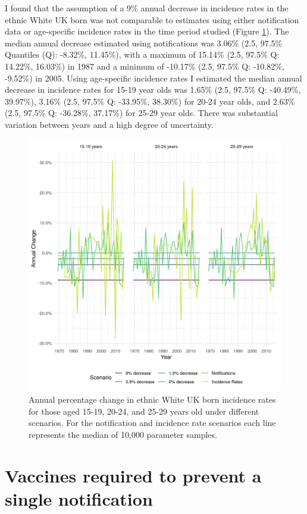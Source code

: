 \documentclass[11pt,twoside]{bristolthesis}
\begin{document}
  I found that the assumption of a 9\% annual decrease in incidence rates in the ethnic White UK born was not comparable to estimates using either notification data or age-specific incidence rates in the time period studied (Figure \ref{fig:plot-annual-change}). The median annual decrease estimated using notifications was 3.06\% (2.5, 97.5\% Quantiles (Q): -8.32\%, 11.45\%), with a maximum of 15.14\% (2.5, 97.5\% Q: 14.22\%, 16.03\%) in 1987 and a minimum of -10.17\% (2.5, 97.5\% Q: -10.82\%, -9.52\%) in 2005. Using age-specific incidence rates I estimated the median annual decrease in incidence rates for 15-19 year olds was 1.65\% (2.5, 97.5\% Q: -40.49\%, 39.97\%), 3.16\% (2.5, 97.5\% Q: -33.95\%, 38.30\%) for 20-24 year olds, and 2.63\% (2.5, 97.5\% Q: -36.28\%, 37.17\%) for 25-29 year olds. There was substantial variation between years and a high degree of uncertainty.
  \begin{figure}
  
  {\centering \includegraphics[width=0.8\linewidth,]{chapters/evidence-policy-change/fig-1} 
  
  }
  
  \caption[Annual percentage change in ethnic White UK born incidence rates for those aged 15-19, 20-24, and 25-29 years old under different scenarios.]{Annual percentage change in ethnic White UK born incidence rates for those aged 15-19, 20-24, and 25-29 years old under different scenarios. For the notification and incidence rate scenarios each line represents the median of 10,000 parameter samples.}\label{fig:plot-annual-change}
  \end{figure}
  \hypertarget{vaccines-required-to-prevent-a-single-notification}{%
  \section{Vaccines required to prevent a single notification}\label{vaccines-required-to-prevent-a-single-notification}}
  
\end{document}
